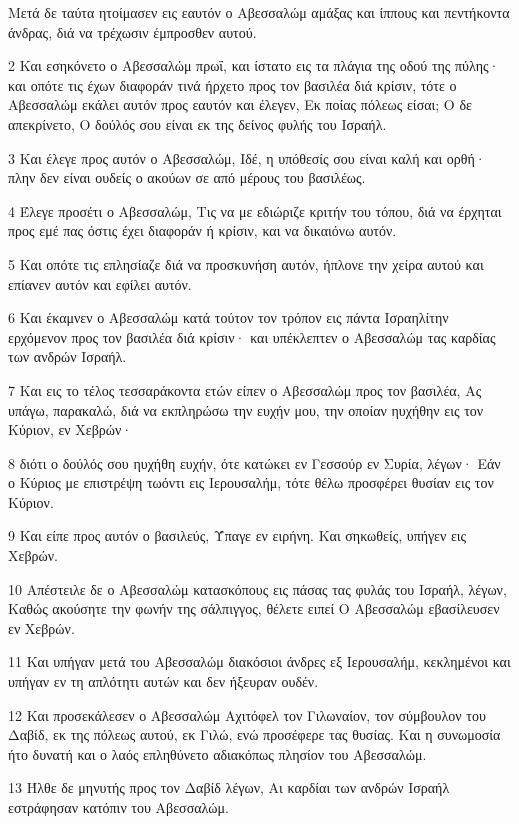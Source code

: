\par Μετά δε ταύτα ητοίμασεν εις εαυτόν ο Αβεσσαλώμ αμάξας και ίππους και πεντήκοντα άνδρας, διά να τρέχωσιν έμπροσθεν αυτού.
\par 2 Και εσηκόνετο ο Αβεσσαλώμ πρωΐ, και ίστατο εις τα πλάγια της οδού της πύλης· και οπότε τις έχων διαφοράν τινά ήρχετο προς τον βασιλέα διά κρίσιν, τότε ο Αβεσσαλώμ εκάλει αυτόν προς εαυτόν και έλεγεν, Εκ ποίας πόλεως είσαι; Ο δε απεκρίνετο, Ο δούλός σου είναι εκ της δείνος φυλής του Ισραήλ.
\par 3 Και έλεγε προς αυτόν ο Αβεσσαλώμ, Ιδέ, η υπόθεσίς σου είναι καλή και ορθή· πλην δεν είναι ουδείς ο ακούων σε από μέρους του βασιλέως.
\par 4 Έλεγε προσέτι ο Αβεσσαλώμ, Τις να με εδιώριζε κριτήν του τόπου, διά να έρχηται προς εμέ πας όστις έχει διαφοράν ή κρίσιν, και να δικαιόνω αυτόν.
\par 5 Και οπότε τις επλησίαζε διά να προσκυνήση αυτόν, ήπλονε την χείρα αυτού και επίανεν αυτόν και εφίλει αυτόν.
\par 6 Και έκαμνεν ο Αβεσσαλώμ κατά τούτον τον τρόπον εις πάντα Ισραηλίτην ερχόμενον προς τον βασιλέα διά κρίσιν· και υπέκλεπτεν ο Αβεσσαλώμ τας καρδίας των ανδρών Ισραήλ.
\par 7 Και εις το τέλος τεσσαράκοντα ετών είπεν ο Αβεσσαλώμ προς τον βασιλέα, Ας υπάγω, παρακαλώ, διά να εκπληρώσω την ευχήν μου, την οποίαν ηυχήθην εις τον Κύριον, εν Χεβρών·
\par 8 διότι ο δούλός σου ηυχήθη ευχήν, ότε κατώκει εν Γεσσούρ εν Συρία, λέγων· Εάν ο Κύριος με επιστρέψη τωόντι εις Ιερουσαλήμ, τότε θέλω προσφέρει θυσίαν εις τον Κύριον.
\par 9 Και είπε προς αυτόν ο βασιλεύς, Ύπαγε εν ειρήνη. Και σηκωθείς, υπήγεν εις Χεβρών.
\par 10 Απέστειλε δε ο Αβεσσαλώμ κατασκόπους εις πάσας τας φυλάς του Ισραήλ, λέγων, Καθώς ακούσητε την φωνήν της σάλπιγγος, θέλετε ειπεί Ο Αβεσσαλώμ εβασίλευσεν εν Χεβρών.
\par 11 Και υπήγαν μετά του Αβεσσαλώμ διακόσιοι άνδρες εξ Ιερουσαλήμ, κεκλημένοι και υπήγαν εν τη απλότητι αυτών και δεν ήξευραν ουδέν.
\par 12 Και προσεκάλεσεν ο Αβεσσαλώμ Αχιτόφελ τον Γιλωναίον, τον σύμβουλον του Δαβίδ, εκ της πόλεως αυτού, εκ Γιλώ, ενώ προσέφερε τας θυσίας. Και η συνωμοσία ήτο δυνατή και ο λαός επληθύνετο αδιακόπως πλησίον του Αβεσσαλώμ.
\par 13 Ήλθε δε μηνυτής προς τον Δαβίδ λέγων, Αι καρδίαι των ανδρών Ισραήλ εστράφησαν κατόπιν του Αβεσσαλώμ.
